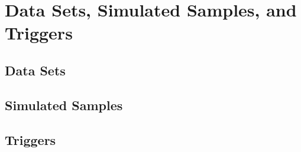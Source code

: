 \section{Data Sets, Simulated Samples, and Triggers}
\label{sec:datasets_simul_trig}

\subsection{Data Sets}

\subsection{Simulated Samples}
\label{subsec:sim_samples}

\subsection{Triggers}
